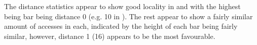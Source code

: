 \documentclass[a4paper,11pt]{article}
\begin{document}
The distance statistics appear to show good locality in  and  with the highest being bar being distance 0 (e.g. 10 in ). The rest appear to show a fairly similar amount of accesses in each, indicated by the height of each bar being fairly similar, however, distance 1 (16) appears to be the most favourable.

\end{document}
